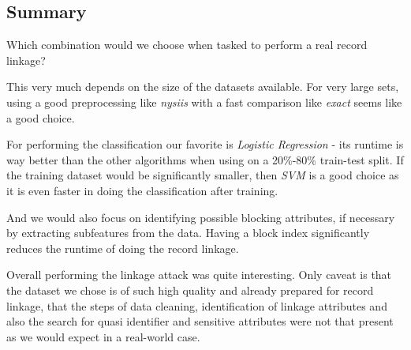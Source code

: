 \documentclass[sigconf,nonacm]{acmart}
\begin{document}
\subsection{Summary}

Which combination would we choose when tasked to perform a real
record linkage?

This very much depends on the size of the datasets available.
For very large sets, using a good preprocessing like \emph{nysiis}
with a fast comparison like \emph{exact} seems like a good choice.

For performing the classification our favorite is \emph{Logistic Regression}
- its runtime is way better than the other algorithms when using on a
20\%-80\%
train-test split.
If the training dataset would be significantly smaller, then
\emph{SVM} is a good choice as it is even faster in doing the
classification after training.

And we would also focus on identifying possible blocking attributes,
if necessary by extracting subfeatures from the data.
Having a block index significantly reduces the runtime of doing the
record linkage.

Overall performing the linkage attack was quite interesting.
Only caveat is that the dataset we chose is of such high quality
and already prepared for record linkage, that the steps of
data cleaning, identification of linkage attributes and
also the search for quasi identifier and sensitive attributes
were not that present as we would expect in a real-world
case.



\end{document}
